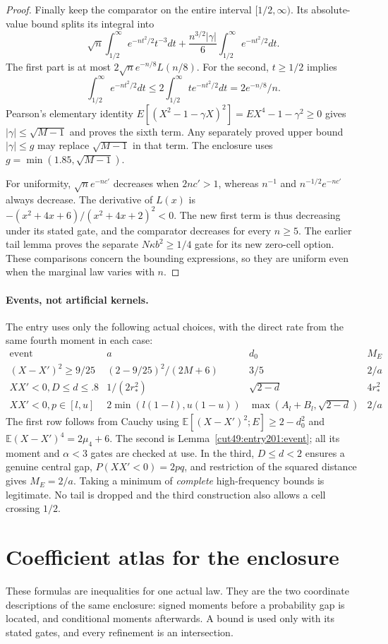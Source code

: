 \documentclass[11pt,a4paper]{article}
\numberwithin{equation}{section}
\theoremstyle{definition}
\theoremstyle{remark}
\newcommand{\E}{\mathbb E}
\begin{document}
\begin{proof}
Finally keep the comparator on the entire interval $[1/2,\infty)$.
Its absolute-value bound splits its integral into
\[
 \sqrt n\int_{1/2}^{\infty}e^{-nt^2/2}t^{-3}dt
 +\frac{n^{3/2}|\gamma|}{6}
                 \int_{1/2}^{\infty}e^{-nt^2/2}dt.
\]
The first part is at most $2\sqrt n e^{-n/8}L(n/8)$.
For the second, $t\ge1/2$ implies
\[
 \int_{1/2}^{\infty}e^{-nt^2/2}dt
 \le2\int_{1/2}^{\infty}t e^{-nt^2/2}dt
 =2e^{-n/8}/n.
\]
Pearson's elementary identity
$E[(X^2-1-\gamma X)^2]=EX^4-1-\gamma^2\ge0$
gives $|\gamma|\le\sqrt{M-1}$ and proves the sixth term.
Any separately proved upper bound $|\gamma|\le g$ may replace
$\sqrt{M-1}$ in that term. The enclosure uses
$g=\min(1.85,\sqrt{M-1})$.

For uniformity, $\sqrt n e^{-nc'}$ decreases when $2nc'>1$,
whereas $n^{-1}$ and $n^{-1/2}e^{-nc'}$ always decrease.
The derivative of $L(x)$ is
$-(x^2+4x+6)/(x^2+4x+2)^2<0$.
The new first term is thus decreasing under its stated gate, and the
comparator decreases for every $n\ge5$. The earlier tail lemma proves
the separate $N\kappa b^2\ge1/4$ gate for its new zero-cell option.
These comparisons concern the bounding expressions, so they are uniform
even when the marginal law varies with $n$.
\end{proof}\paragraph{Events, not artificial kernels.}\label{cut49:fourier:events}
The entry uses only the following actual choices, with the direct rate
from the same fourth moment in each case:
\[
\begin{array}{c|c|c|c}
 \text{event}&a&d_0&M_E\\\hline
 (X-X')^2\ge9/25 &(2-9/25)^2/(2M+6)&3/5&2/a\\
 XX'<0, D\le d\le.8 &1/(2r_*^2)&\sqrt{2-d}&4r_*^2\\
 XX'<0, p\in[l,u] &2\min(l(1-l),u(1-u))
 &\max(A_l+B_l,\sqrt{2-d})&2/a
\end{array}
\]
The first row follows from Cauchy using
$\E[(X-X')^2;E]\ge2-d_0^2$ and
$\E(X-X')^4=2\mu_4+6$. The second is Lemma~\ref{cut49:entry201:event}; all its moment and $\alpha<3$ gates are checked at use.
In the third, $D\le d<2$ ensures a genuine central gap,
$P(XX'<0)=2pq$, and restriction of the squared distance gives $M_E=2/a$.
Taking a minimum of \emph{complete} high-frequency bounds is legitimate. No tail is
dropped and the third construction also allows a cell crossing $1/2$.

\section{Coefficient atlas for the enclosure}\label{cut49:re:atlas}
These formulas are inequalities for one actual law. They are the two
coordinate descriptions of the same enclosure: signed moments before a
probability gap is located, and conditional moments afterwards. A bound
is used only with its stated gates, and every refinement is an intersection.
\end{document}
